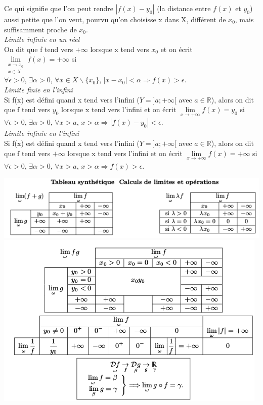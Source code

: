 \documentclass[a4paper,10pt]{book}
\newcommand{\R}{\mathbb{R}}
\begin{document}
Ce qui signifie que l'on peut rendre $|f(x)-y_{0}|$ (la distance entre $f(x)$ et $y_{0}$) aussi petite que l'on veut, pourvu qu'on choisisse x dans X, différent de $x_{0}$, mais suffisamment proche de $x_{0}$.\\

\textit{Limite infinie en un réel}\\
On dit que f tend vers $+\infty$ lorsque x tend vers $x_{0}$ et on écrit $\lim\limits_{\substack{x \rightarrow x_{0} \\ x \in X}} f(x)=+\infty$ si\\
$\forall \epsilon >0$, $\exists \alpha >0$, $\forall x \in X\backslash \{x_{0}\}$, $|x-x_{0}|<\alpha \Longrightarrow f(x)>\epsilon$.\\

\textit{Limite finie en l'infini}\\
Si f(x) est défini quand x tend vers l'infini ($Y=]a;+\infty[$ avec $a \in \R$), alors on dit que f tend vers $y_{0}$ lorsque x tend vers l'infini et on écrit $\underset{x \rightarrow + \infty}{\lim} f(x)=y_{0}$ si\\
$\forall \epsilon >0$, $\exists \alpha >0$, $\forall x>a$, $x>\alpha \Longrightarrow |f(x)-y_{0}|<\epsilon$.\\

\textit{Limite infinie en l'infini}\\
Si f(x) est défini quand x tend vers l'infini ($Y=]a;+\infty[$ avec $a \in \R$), alors on dit que f tend vers $+\infty$ lorsque x tend vers l'infini et on écrit $\underset{x \rightarrow + \infty}{\lim} f(x)=+\infty$ si\\
$\forall \epsilon >0$, $\exists \alpha >0$, $\forall x>a$, $x>\alpha \Longrightarrow f(x)>\epsilon$.\\
\begin{center}
\includegraphics[scale=0.675]{images/024.png}
\includegraphics[scale=0.725]{images/023.png}
\end{center}
\end{document}
